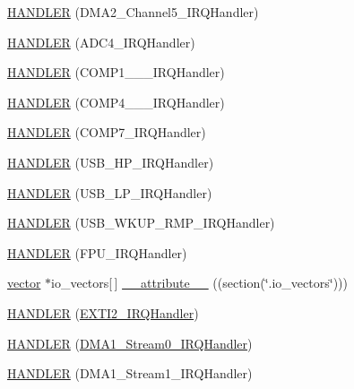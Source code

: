 \begin{DoxyCompactItemize}
\item 
\hyperlink{group___p_i_o_s_ga1dc19efd10bf2b57f76e057d9658e34e}{\-H\-A\-N\-D\-L\-E\-R} (\-D\-M\-A2\-\_\-\-Channel5\-\_\-\-I\-R\-Q\-Handler)
\item 
\hyperlink{group___p_i_o_s_gaf4e7f7a30685280c61aeb5b7d8c00e25}{\-H\-A\-N\-D\-L\-E\-R} (\-A\-D\-C4\-\_\-\-I\-R\-Q\-Handler)
\item 
\hyperlink{group___p_i_o_s_ga6e46c1bfa9fb159be005578cbc9a51f8}{\-H\-A\-N\-D\-L\-E\-R} (\-C\-O\-M\-P1\-\_\-\_\-\_\-\-I\-R\-Q\-Handler)
\item 
\hyperlink{group___p_i_o_s_ga65ff2e4915c9602921fa55ee1b22ab95}{\-H\-A\-N\-D\-L\-E\-R} (\-C\-O\-M\-P4\-\_\-\_\-\_\-\-I\-R\-Q\-Handler)
\item 
\hyperlink{group___p_i_o_s_ga239a311cf01f1abba2e728f1be1019cf}{\-H\-A\-N\-D\-L\-E\-R} (\-C\-O\-M\-P7\-\_\-\-I\-R\-Q\-Handler)
\item 
\hyperlink{group___p_i_o_s_ga6fb28e184c11d412c0da98fdf5f85eb8}{\-H\-A\-N\-D\-L\-E\-R} (\-U\-S\-B\-\_\-\-H\-P\-\_\-\-I\-R\-Q\-Handler)
\item 
\hyperlink{group___p_i_o_s_gadc437f3a400a1fc9bc0bfe89c4be65f9}{\-H\-A\-N\-D\-L\-E\-R} (\-U\-S\-B\-\_\-\-L\-P\-\_\-\-I\-R\-Q\-Handler)
\item 
\hyperlink{group___p_i_o_s_gaa4d740a7c852a7547495df644d526cf7}{\-H\-A\-N\-D\-L\-E\-R} (\-U\-S\-B\-\_\-\-W\-K\-U\-P\-\_\-\-R\-M\-P\-\_\-\-I\-R\-Q\-Handler)
\item 
\hyperlink{group___p_i_o_s_gad4883dff4ea4e95dc98860af9735954b}{\-H\-A\-N\-D\-L\-E\-R} (\-F\-P\-U\-\_\-\-I\-R\-Q\-Handler)
\item 
\hyperlink{group___p_i_o_s_ga3c46a32d92954306e54f6e9acdd9eaac}{vector} $\ast$io\-\_\-vectors\mbox{[}$\,$\mbox{]} \hyperlink{group___p_i_o_s_ga8f4cc61b58aac9810254db781951ac28}{\-\_\-\-\_\-attribute\-\_\-\-\_\-} ((section(\char`\"{}.io\-\_\-vectors\char`\"{})))
\item 
\hyperlink{group___p_i_o_s_ga8f4231146f11b7ec2b7cfe4789a1afa3}{\-H\-A\-N\-D\-L\-E\-R} (\hyperlink{group___p_i_o_s___e_x_t_i_gab5a1d9e9c8ef50e0cb9ddb5745a20a14}{\-E\-X\-T\-I2\-\_\-\-I\-R\-Q\-Handler})
\item 
\hyperlink{group___p_i_o_s_ga13fe24463da7f0ad3f1c1967d5f85514}{\-H\-A\-N\-D\-L\-E\-R} (\hyperlink{group___revo_mini_ga1b70a4441662b1d6548e803499da414f}{\-D\-M\-A1\-\_\-\-Stream0\-\_\-\-I\-R\-Q\-Handler})
\item 
\hyperlink{group___p_i_o_s_ga56c01029b55ddc924fed289f14797c89}{\-H\-A\-N\-D\-L\-E\-R} (\-D\-M\-A1\-\_\-\-Stream1\-\_\-\-I\-R\-Q\-Handler)

\end{DoxyCompactItemize}
